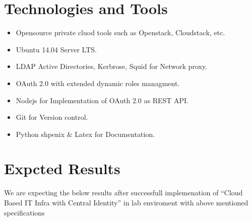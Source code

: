 \documentclass[12pt]{report}
\begin{document}
\section{Technologies and Tools}

	\begin{itemize}
		\item Opensource private cluod tools such as Openstack, Cloudstack, etc.
		\item Ubuntu 14.04 Server LTS.
		\item LDAP Active Directories, Kerbrose, Squid for Network proxy.
		\item OAuth 2.0 with extended dynamic roles managment.
		\item Nodejs for Implementation of OAuth 2.0 as REST API.
		\item Git for Version control. 
		\item Python shpenix \& Latex for Documentation.
	\end{itemize}
	
\section{Expcted Results}

	We are expecting the below results after successfull implemenation of ``Cloud Based IT Infra with Central Identity'' in lab enviroment with above mentioned specifications
\end{document}
